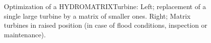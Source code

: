 \begin{figure}[h!]
\begin{minipage}[b]{0.5\linewidth}
 \centering
\end{minipage}
\begin{minipage}[b]{0.5\linewidth}
 \centering
\end{minipage}
\caption{Optimization of a HYDROMATRIX\circledR Turbine: Left; replacement of a single large turbine by a matrix of smaller ones. Right; Matrix turbines in raised position (in case of flood conditions, inspection or maintenance).}
\label{Matrix_a}
\end{figure}

